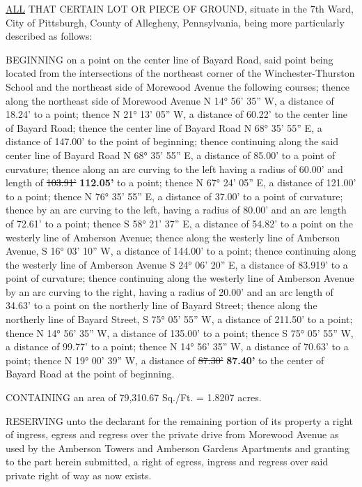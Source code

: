 \documentclass[
]{book}
\begin{document}
\protect\hyperlink{ArtII}{ALL} THAT CERTAIN LOT OR PIECE OF GROUND, situate in the 7th Ward, City of Pittsburgh, County of Allegheny, Pennsylvania, being more particularly described as follows:

BEGINNING on a point on the center line of Bayard Road, said point being located from the intersections of the northeast corner of the Winchester-Thurston School and the northeast side of Morewood Avenue the following courses; thence along the northeast side of Morewood Avenue N 14° 56' 35'' W, a distance of 18.24' to a point; thence N 21° 13' 05'' W, a distance of 60.22' to the center line of Bayard Road; thence the center line of Bayard Road N 68° 35' 55'' E, a distance of 147.00' to the point of beginning; thence continuing along the said center line of Bayard Road N 68° 35' 55'' E, a distance of 85.00' to a point of curvature; thence along an arc curving to the left having a radius of 60.00' and length of \sout{103.91'} \textbf{112.05'} to a point; thence N 67° 24' 05'' E, a distance of 121.00' to a point; thence N 76° 35' 55'' E, a distance of 37.00' to a point of curvature; thence by an arc curving to the left, having a radius of 80.00' and an arc length of 72.61' to a point; thence S 58° 21' 37'' E, a distance of 54.82' to a point on the westerly line of Amberson Avenue; thence along the westerly line of Amberson Avenue, S 16° 03' 10'' W, a distance of 144.00' to a point; thence continuing along the westerly line of Amberson Avenue S 24° 06' 20'' E, a distance of 83.919' to a point of curvature; thence continuing along the westerly line of Amberson Avenue by an arc curving to the right, having a radius of 20.00' and an arc length of 34.63' to a point on the northerly line of Bayard Street; thence along the northerly line of Bayard Street, S 75° 05' 55'' W, a distance of 211.50' to a point; thence N 14° 56' 35'' W, a distance of 135.00' to a point; thence S 75° 05' 55'' W, a distance of 99.77' to a point; thence N 14° 56' 35'' W, a distance of 70.63' to a point; thence N 19° 00' 39'' W, a distance of \sout{87.30'} \textbf{87.40'} to the center of Bayard Road at the point of beginning.

CONTAINING an area of 79,310.67 Sq./Ft. = 1.8207 acres.

RESERVING unto the declarant for the remaining portion of its property a right of ingress, egress and regress over the private drive from Morewood Avenue as used by the Amberson Towers and Amberson Gardens Apartments and granting to the part herein submitted, a right of egress, ingress and regress over said private right of way as now exists.
\end{document}
